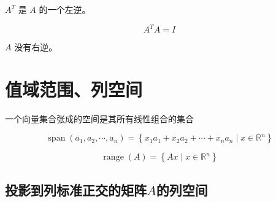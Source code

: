 \begin{theorem}
    $ A^{T} $ 是 $ A $ 的一个左逆。

    $$A^T A =I$$
\end{theorem}

\begin{theorem}
    $ A $ 没有右逆。
\end{theorem}

\section{值域范围、列空间}

\begin{definition}[向量集合张成的空间]
    一个向量集合张成的空间是其所有线性组合的集合

    $$ \operatorname{span}\left(a_{1}, a_{2}, \cdots, a_{n}\right)=\left\{x_{1} a_{1}+x_{2} a_{2}+\cdots+x_{n} a_{n} \mid x \in \mathbb{R}^{n}\right\} $$
\end{definition}

\begin{definition}
    $$ \operatorname{range}(A)=\left\{A x \mid x \in \mathbb{R}^{n}\right\} $$
\end{definition}

\subsection{投影到列标准正交的矩阵$A$的列空间}

